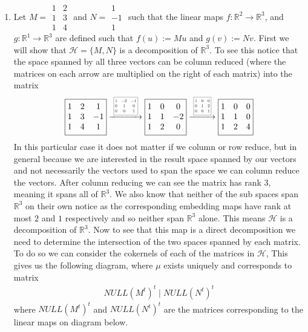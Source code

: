 \documentclass[12pt]{amsart}
\theoremstyle{definition}
\newcommand{\R}{\mathbb{R}}
\newcommand{\ra}{\rightarrow}
\begin{document}
\begin{enumerate}
\item Let $M=\boxed{\begin{matrix}
    1 & 2\\
    1 & 3\\
    1 & 4
\end{matrix}}$ and $N=\boxed{\begin{matrix}
    1\\
    -1\\
    1
\end{matrix}}$ such that the linear maps $f:\R^2\ra\R^3$, and $g:\R^1\ra\R^3$ are defined such that $f(u):=Mu$ and $g(v):= Nv$. First we will show that $\mathcal{H}=\{M,N\}$ is a decomposition of $\R^3$. To see this notice that the space spanned by all three vectors can be column reduced (where the matrices on each arrow are multiplied on the right of each matrix) into the matrix
$$\boxed{\begin{matrix}
    1 & 2 & 1\\
    1 & 3 & -1\\
    1 & 4 & 1
\end{matrix}}
\xrightarrow{\scalebox{0.5}{\;
\boxed{\begin{matrix}
    1 & -2 & -1\\
    0 & 1 & 0\\
    0 & 0 & 1
\end{matrix}}\;}}
\boxed{\begin{matrix}
    1 & 0 & 0\\
    1 & 1 & -2\\
    1 & 2 & 0
\end{matrix}}
\xrightarrow{\scalebox{0.5}{\;
\boxed{\begin{matrix}
    1 & 0 & 0\\
    0 & 1 & 2\\
    0 & 0 & 1
\end{matrix}}\;}}
\boxed{\begin{matrix}
    1 & 0 & 0\\
    1 & 1 & 0\\
    1 & 2 & 4
\end{matrix}}$$
In this particular case it does not matter if we column or row reduce, but in general because we are interested in the result space spanned by our vectors and not necessarily the vectors used to span the space we can column reduce the vectors.
After column reducing we can see the matrix has rank $3$, meaning it spans all of $\R^3$.
We also know that neither of the sub spaces span $\R^3$ on their own notice as the corresponding embedding maps have rank at most $2$ and $1$ respectively and so neither span $\R^3$ alone. This means $\mathcal{H}$ is a decomposition of $\R^3$. Now to see that this map is a direct decomposition we need to determine the intersection of the two spaces spanned by each matrix. To do so we can consider the cokernels of each of the matrices in $\mathcal{H}$, This gives us the following diagram, where $\mu$ exists uniquely and corresponds to matrix $$\boxed{\begin{matrix}NULL(M^t)^t\;| \;NULL(N^t)^t\end{matrix}}$$
where $NULL(M^t)^t$ and $NULL(N^t)^t$ are the matrices corresponding to the linear maps on diagram below.


\end{enumerate}
\end{document}
